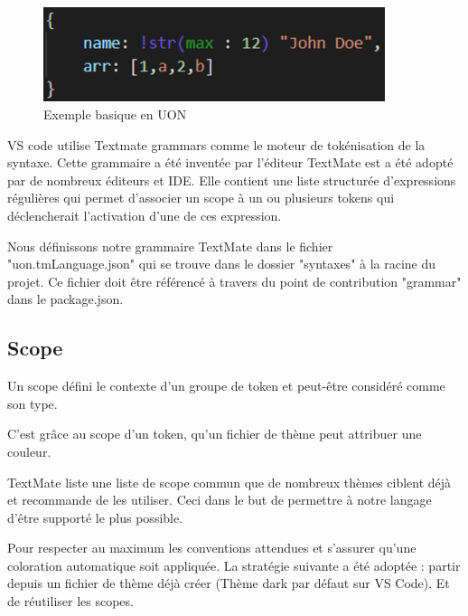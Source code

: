 \documentclass[
    iict, %
    il, %
]{heig-tb}
\begin{document}
\begin{figure}[!h]
    \begin{center}
        \includegraphics[width=10cm]{assets/figures/basic-uon.png}
    \end{center}
    \caption[code UON]{\label{basic-uon} Exemple basique en UON}
\end{figure}


VS code utilise Textmate grammars \cite{textmate-grammars} comme le moteur de tokénisation de la syntaxe.
Cette grammaire a été inventée par l'éditeur TextMate est a été adopté par de nombreux éditeurs et IDE.
Elle contient une liste structurée d'expressions régulières qui permet d'associer un scope
à un ou plusieurs tokens qui déclencherait l'activation d'une de ces expression.


Nous définissons notre grammaire TextMate dans le fichier "uon.tmLanguage.json" qui se trouve dans le dossier "syntaxes" à la racine du projet.
Ce fichier doit être référencé à travers du point de contribution "grammar" dans le package.json.


\subsection{Scope}
Un scope défini le contexte d'un groupe de token et peut-être considéré comme son type.

C'est grâce au scope d'un token, qu'un fichier de thème peut attribuer une couleur.

TextMate liste une liste de scope commun que de nombreux thèmes ciblent déjà et recommande de les utiliser.
Ceci dans le but de permettre à notre langage d'être supporté le plus possible.

Pour respecter au maximum les conventions attendues et s'assurer qu'une coloration automatique soit appliquée. La stratégie suivante a été adoptée : partir depuis un fichier de thème déjà créer (Thème dark par défaut sur VS Code). Et de réutiliser les scopes.
\end{document}
